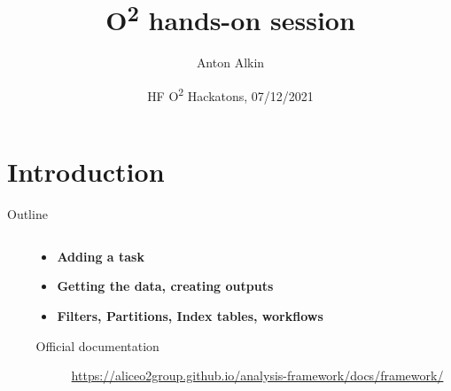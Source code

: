\documentclass[10pt,lualatex,xcolor={table,svgnames},{hyperref={bookmarks=true,linktoc=all}},aspectratio=169]{beamer}
\begin{document}
    \author[Anton Alkin]{Anton Alkin}
    \title{O\textsuperscript{2} hands-on session}
    \date[O\textsuperscript{2} Hackaton, 07/12/2021]{HF O\textsuperscript{2} Hackatons, 07/12/2021}

    \begin{frame}{}
        \maketitle
    \end{frame}

    \section{Introduction}

    \begin{frame}{Outline}
        \begin{columns}
            \begin{column}{0.02\paperwidth}
            \end{column}
            \begin{column}[c]{0.9\paperwidth}
                \begin{itemize}
                    \item {\huge\bfseries Adding a task}
                    \item {\huge\bfseries Getting the data, creating outputs}
                    \item {\huge\bfseries Filters, Partitions, Index tables, workflows}
                \end{itemize}
                \vspace{1em}
                {\small
                    \begin{description}
                        \item[Official documentation] \href{https://aliceo2group.github.io/analysis-framework/docs/framework/}{https://aliceo2group.github.io/analysis-framework/docs/framework/}
                \end{description}}
            \end{column}
        \end{columns}
    \end{frame}
\end{document}
